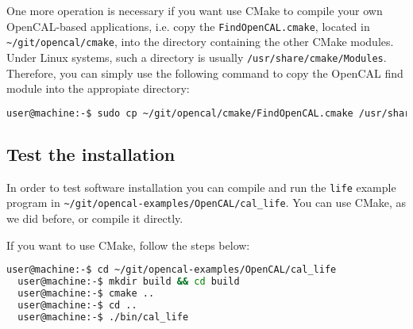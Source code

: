 
One more operation is necessary if you want use CMake to compile your
own OpenCAL-based applications, i.e. copy the
\verb'FindOpenCAL.cmake', located in \verb'~/git/opencal/cmake', into
the directory containing the other CMake modules. Under Linux systems,
such a directory is usually
\verb'/usr/share/cmake/Modules'. Therefore, you can simply use the
following command to copy the OpenCAL find module into the appropiate
directory:

\begin{lstlisting}[numbers=none,language=bash]
  user@machine:-$ sudo cp ~/git/opencal/cmake/FindOpenCAL.cmake /usr/share/cmake/Modules
\end{lstlisting}


\subsection{Test the installation}\label{sec:installation:test_installation}

In order to test software installation you can compile and run the
\verb'life' example program in
\verb'~/git/opencal-examples/OpenCAL/cal_life'. You can use CMake, as
we did before, or compile it directly.

If you want to use CMake, follow the steps below:

\begin{lstlisting}[numbers=none,language=bash]
  user@machine:-$ cd ~/git/opencal-examples/OpenCAL/cal_life
  user@machine:-$ mkdir build && cd build
  user@machine:-$ cmake ..
  user@machine:-$ cd ..
  user@machine:-$ ./bin/cal_life  
\end{lstlisting}


